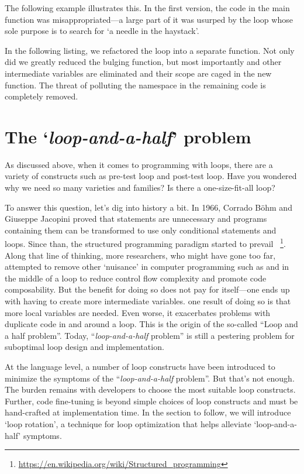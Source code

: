 The following example illustrates this.
In the first version, the code in the main function  was
misappropriated---a large part of it was usurped by the loop whose sole purpose
is to search for `a needle in the haystack'.

In the following listing, we refactored the loop into a separate function.
Not only did we greatly reduced the bulging function, but most importantly
 and other intermediate variables are eliminated and
their scope are caged in the new function.
The threat of polluting the namespace in the remaining code is completely removed.



\section{The `\textit{loop-and-a-half}' problem}\label{sec:loop-and-a-half-Problem}

As discussed above, when it comes to programming with loops, there are a variety of constructs
such as pre-test loop and post-test loop.
Have you wondered why we need so many varieties and families?
Is there a one-size-fit-all loop?


To answer this question, let's dig into history a bit.
In 1966, Corrado B\"{o}hm and Giuseppe Jacopini proved that  statements are
unnecessary and programs containing them can be transformed to use only conditional statements
and loops\cite{Bohm:1966}.
Since than, the structured programming paradigm started to prevail
~\footnote{\url{https://en.wikipedia.org/wiki/Structured_programming}}.
Along that line of thinking, more researchers, who might have gone too far, attempted to remove
other `nuisance' in computer programming such as  and  in the middle of a
loop to reduce control flow complexity and promote code composability.
But the benefit for doing so does not pay for itself---one ends up with having to create more
intermediate variables.
one result of doing so is that more local variables are needed.
Even worse, it exacerbates problems with duplicate code in and around a loop.
This is the origin of the so-called ``Loop and a half problem''\cite{Louden-Lambert-2011}.
Today, ``\textit{loop-and-a-half} problem'' is still a pestering problem for suboptimal loop
design and implementation.


At the language level, a number of loop constructs have been introduced to
minimize the symptoms of the ``\textit{loop-and-a-half} problem''.
But that's not enough.
The burden remains with developers to choose the most suitable loop constructs.
Further, code fine-tuning is beyond simple choices of loop constructs
and must be hand-crafted at implementation time.
In the section to follow, we will introduce `loop rotation', a technique for loop
optimization that helps alleviate `loop-and-a-half' symptoms.


